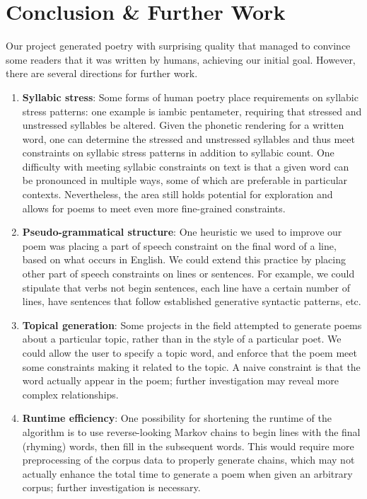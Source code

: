 \documentclass[10pt,twocolumn]{article}
\begin{document}
\section{Conclusion \& Further Work}
Our project generated poetry with surprising quality that managed to convince some readers that it was written by humans, achieving our initial goal. However, there are several directions for further work. 
\begin{enumerate}
\item \textbf{Syllabic stress}: Some forms of human poetry place requirements on syllabic stress patterns: one example is iambic pentameter, requiring that stressed and unstressed syllables be altered. Given the phonetic rendering for a written word, one can determine the stressed and unstressed syllables and thus meet constraints on syllabic stress patterns in addition to syllabic count. One difficulty with meeting syllabic constraints on text is that a given word can be pronounced in multiple ways, some of which are preferable in particular contexts. Nevertheless, the area still holds potential for exploration and allows for poems to meet even more fine-grained constraints. 
\item \textbf{Pseudo-grammatical structure}: One heuristic we used to improve our poem was placing a part of speech constraint on the final word of a line, based on what occurs in English. We could extend this practice by placing other part of speech constraints on lines or sentences. For example, we could stipulate that verbs not begin sentences, each line have a certain number of lines, have sentences that follow established generative syntactic patterns, etc.
\item \textbf{Topical generation}: Some projects in the field attempted to generate poems about a particular topic, rather than in the style of a particular poet. We could allow the user to specify a topic word, and enforce that the poem meet some constraints making it related to the topic. A naive constraint is that the word actually appear in the poem; further investigation may reveal more complex relationships.
\item \textbf{Runtime efficiency}: One possibility for shortening the runtime of the algorithm is to use reverse-looking Markov chains to begin lines with the final (rhyming) words, then fill in the subsequent words. This would require more preprocessing of the corpus data to properly generate chains, which may not actually enhance the total time to generate a poem when given an arbitrary corpus; further investigation is necessary. 

\end{enumerate}
\end{document}
